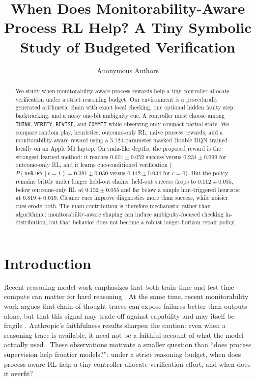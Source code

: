 \documentclass{article}
\title{When Does Monitorability-Aware Process RL Help? A Tiny Symbolic Study of Budgeted Verification}
\author{Anonymous Authors}
\begin{document}
\maketitle

\begin{abstract}
We study when monitorability-aware process rewards help a tiny controller allocate verification under a strict reasoning budget. Our environment is a procedurally generated arithmetic chain with exact local checking, one optional hidden faulty step, backtracking, and a noisy one-bit ambiguity cue. A controller must choose among \texttt{THINK}, \texttt{VERIFY}, \texttt{REVISE}, and \texttt{COMMIT} while observing only compact partial state. We compare random play, heuristics, outcome-only RL, naive process rewards, and a monitorability-aware reward using a 5,124-parameter masked Double DQN trained locally on an Apple M1 laptop. On train-like depths, the proposed reward is the strongest learned method: it reaches $0.601 \pm 0.052$ success versus $0.234 \pm 0.099$ for outcome-only RL, and it learns cue-conditioned verification ($P(\texttt{VERIFY}\mid c{=}1)=0.381 \pm 0.030$ versus $0.142 \pm 0.034$ for $c{=}0$). But the policy remains brittle under longer held-out chains: held-out success drops to $0.112 \pm 0.035$, below outcome-only RL at $0.132 \pm 0.055$ and far below a simple hint-triggered heuristic at $0.819 \pm 0.019$. Cleaner cues improve diagnostics more than success, while noisier cues erode both. The main contribution is therefore mechanistic rather than algorithmic: monitorability-aware shaping can induce ambiguity-focused checking in-distribution, but that behavior does not become a robust longer-horizon repair policy.
\end{abstract}

\section{Introduction}
Recent reasoning-model work emphasizes that both train-time and test-time compute can matter for hard reasoning \citep{openai_reasoning_2024,deepseek_r1_2025}. At the same time, recent monitorability work argues that chain-of-thought traces can expose failures better than outputs alone, but that this signal may trade off against capability and may itself be fragile \citep{openai_monitorability_2025}. Anthropic's faithfulness results sharpen the caution: even when a reasoning trace is available, it need not be a faithful account of what the model actually used \citep{anthropic_faithfulness_2025}. These observations motivate a smaller question than ``does process supervision help frontier models?'': under a strict reasoning budget, when does process-aware RL help a tiny controller allocate verification effort, and when does it overfit?
\end{document}
